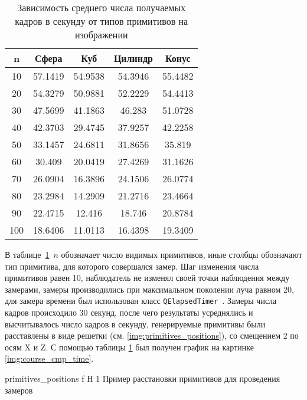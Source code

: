 \begin{table}[ht]
	\centering
	\caption{Зависимость среднего числа получаемых кадров в секунду от типов примитивов на изображении}
	\begin{tabular}{|c|c|c|c|c|}
		\hline
		n   & Сфера   & Куб     & Цилиндр & Конус   \\ \hline
		10  & 57.1419 & 54.9538 & 54.3946 & 55.4482 \\ \hline
		20  & 54.3279 & 50.9881 & 52.2229 & 54.4413 \\ \hline
		30  & 47.5699 & 41.1863 & 46.283  & 51.0728 \\ \hline
		40  & 42.3703 & 29.4745 & 37.9257 & 42.2258 \\ \hline
		50  & 33.1457 & 24.6811 & 31.8656 & 35.819  \\ \hline
		60  & 30.409  & 20.0419 & 27.4269 & 31.1626 \\ \hline
		70  & 26.0904 & 16.3896 & 24.1506 & 26.0774 \\ \hline
		80  & 23.2984 & 14.2909 & 21.2716 & 23.4664 \\ \hline
		90  & 22.4715 & 12.416  & 18.746  & 20.8784 \\ \hline
		100 & 18.6406 & 11.0113 & 16.4398 & 19.3409 \\ \hline
	\end{tabular}
	\label{t:timings}
\end{table}

В таблице~\ref{t:timings}~$n$ обозначает число видимых примитивов, иные столбцы обозначают тип примитива, для которого совершался замер. Шаг изменения числа примитивов равен 10, наблюдатель не изменял своей точки наблюдения между замерами, замеры производились при максимальном поколении луча равном 20, для замера времени был использован класс \texttt{QElapsedTimer}~\cite{QTimer}.
Замеры числа кадров  происходило 30 секунд, после чего результаты усреднялись и высчитывалось число кадров в секунду,  генерируемые примитивы были расставлены в виде решетки (см. \ref{img:primitives_positions}), со смещением 2 по осям X и Z. С помощью таблицы \ref{t:timings} был получен график на картинке \ref{img:course_cmp_time}.


{primitives_positions} %
{f} %
{H} %
{1\textwidth} %
{Пример расстановки примитивов для проведения замеров} %



